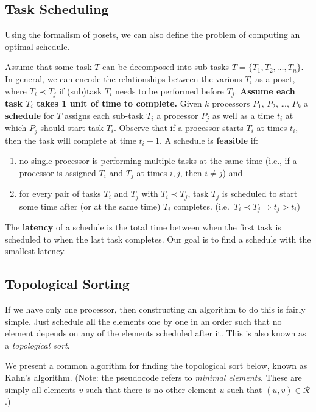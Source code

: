 \documentclass{article}
\begin{document}
    \subsection*{Task Scheduling}
    
    Using the formalism of posets, we can also define the problem of computing an optimal schedule.

    \vspace{3mm} Assume that some task $T$ can be decomposed into sub-tasks $T = \{T_{1}, T_{2}, \dots, T_{n}\}$. In general, we can encode the relationships between the various $T_{i}$ as a poset, where $T_{i} \prec T_{j}$ if (sub)task $T_{i}$ needs to be performed before $T_{j}$. \textbf{Assume each task $T_{i}$ takes 1 unit of time to complete.} Given $k$ processors $P_{1}$, $P_{2}$, \dots, $P_{k}$ a \textbf{schedule} for $T$ assigns each sub-task $T_{i}$ a processor $P_{j}$ as well as a time $t_{i}$ at which $P_{j}$ should start task $T_{i}$. Observe that if a processor starts $T_{i}$ at times $t_{i}$, then the task will complete at time $t_{i} + 1$. A schedule is \textbf{feasible} if:
    \begin{enumerate}[label = \arabic*]
        \item no single processor is performing multiple tasks at the same time (i.e., if a processor is assigned $T_{i}$ and $T_{j}$ at times $i, j$, then $i \ne j$) and
        \item for every pair of tasks $T_{i}$ and $T_{j}$ with $T_{i} \prec T_{j}$, task $T_{j}$ is scheduled to start some time after (or at the same time) $T_{i}$ completes. (i.e.\ $T_{i} \prec T_{j} \Rightarrow t_{j} > t_{i}$)
    \end{enumerate}
    The \textbf{latency} of a schedule is the total time between when the first task is scheduled to when the last task completes. Our goal is to find a schedule with the smallest latency.

    \subsection*{Topological Sorting}
    If we have only one processor, then constructing an algorithm to do this is fairly simple. Just schedule all the elements one by one in an order such that no element depends on any of the elements scheduled after it. This is also known as a \textit{topological sort}.

    \vspace{3mm}
    We present a common algorithm for finding the topological sort below, known as Kahn's algorithm. (Note: the pseudocode refers to \textit{minimal elements}. These are simply all elements $v$ such that there is no other element $u$ such that $(u, v) \in \mathcal{R}$.)
\end{document}
